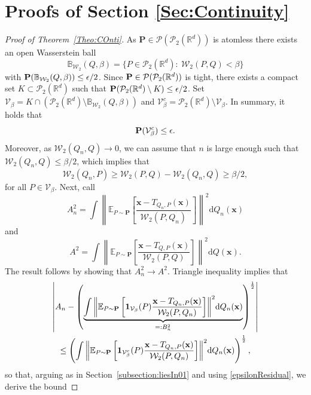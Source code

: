 \documentclass{imsart}
\numberwithin{equation}{section}
\def\R{\mathbb{R}}
\def\E{\mathbb{E}}
\def\x{\mathbf{x}}
\def\E{\mathbb E}
\def\x{\mathbf x}
\begin{document}
\section{Proofs of Section \ref{Sec:Continuity}}
\begin{proof}[Proof of Theorem~\ref{Theo:COnti}] 
	As $\mathbf{P}\in \mathcal{P}(\mathcal{P}_{2}(\R^d)) $ is atomless there exists an open  Wasserstein ball
	$$ \mathbb{B}_{\mathcal{W}_2}(Q,\beta)=\{P\in \mathcal{P}_{2}(\R^d): \ \mathcal{W}_2(P,Q)< \beta\}$$
	with ${\bf P}(\mathbb{B}_{\mathcal{W}_2}(Q,\beta))\leq \epsilon/2$. Since ${\bf P} \in  \mathcal{P}(\mathcal{P}_{2}(\R^d)) $ is tight, there exists a compact set $K\subset \mathcal{P}_{2}(\R^d)$ such that 
	${\bf P}(\mathcal{P}_{2}(\R^d)\setminus K) \leq \epsilon/2 $.
	Set 
	$\mathcal{V}_\beta= K\cap (\mathcal{P}_{2}(\R^d)\setminus \mathbb{B}_{\mathcal{W}_2}(Q,\beta))$ and $\mathcal{V}_\beta^c= \mathcal{P}_{2}(\R^d)\setminus \mathcal{V}_\beta$. In summary, it holds that 
	\begin{equation}
		\label{epsilonResidual}
		{\bf P}(\mathcal{V}_\beta^c) \leq \epsilon.
	\end{equation}
	Moreover, as $\mathcal{W}_2(Q_n,Q) \to 0 $, we can assume that $n$ is large enough such that $\mathcal{W}_2(Q_n,Q)\leq \beta/2$, which implies that
	\begin{equation}
		\label{eq:farfromBeta}
		\mathcal{W}_2(Q_n,P)\geq \mathcal{W}_2(P,Q) -\mathcal{W}_2(Q_n,Q) \geq  \beta/2,
	\end{equation}
	for all $P\in \mathcal{V}_\beta$.  Next, call 
	$$ A_n^2=\int{ \left\|\E_{P\sim \mathbf{P}}\left[  \frac{\x-T_{Q_n,P}(\x) }{\mathcal{W}_2(P,Q_n)}\right]\right\|^2} \mathrm{d}Q_n(\x) $$
	and 
	$$ A^2=\int{ \left\|\E_{P\sim \mathbf{P}}\left[  \frac{\x-T_{Q,P}(\x) }{\mathcal{W}_2(P,Q)}\right]\right\|^2} \mathrm{d}Q(\x). $$
	The result follows by showing that $ A_n^2\to A^2$. Triangle inequality implies that 
	\begin{multline*}
		\left\vert A_n-\left(\underbrace{\int{ \left\|\E_{P\sim \mathbf{P}}\left[ {\bf 1}_{\mathcal{V}_\beta}(P) \frac{\x-T_{Q_n,P}(\x) }{\mathcal{W}_2(P,Q_n)}\right]\right\|^2} \mathrm{d}Q_n(\x)}_{=:B_n^2} \right)^{\frac{1}{2}} \right|\\
		\leq \left(\int{ \left\|\E_{P\sim \mathbf{P}}\left[ {\bf 1}_{\mathcal{V}_\beta^c}(P) \frac{\x-T_{Q_n,P}(\x) }{\mathcal{W}_2(P,Q_n)}\right]\right\|^2} \mathrm{d}Q_n (\x) \right)^{\frac{1}{2}},
	\end{multline*}
	so that, arguing as in Section~\ref{subsection:liesIn01} and using \eqref{epsilonResidual}, we derive the bound 

\end{proof}
\end{document}
